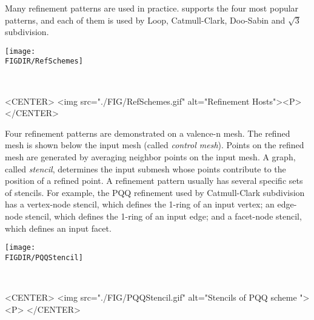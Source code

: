 Many refinement patterns are used in practice. 
 supports the four most popular 
patterns, and each of them is used by Loop, 
Catmull-Clark\cite{cgal:cc-rgbss-78}, Doo-Sabin 
and $\sqrt{3}$ subdivision.  

\begin{ccTexOnly}
  \begin{center}
    \parbox{0.6\textwidth}{%
      \texttt{[image: \\FIGDIR/RefSchemes]}%
    }\\ \vspace{0.5cm}
  \end{center}
\end{ccTexOnly}

\begin{ccHtmlOnly}
  <CENTER>
     <img src="./FIG/RefSchemes.gif" alt="Refinement Hosts"><P>
  </CENTER>
\end{ccHtmlOnly}

Four refinement patterns are demonstrated on a valence-n mesh.
The refined mesh is shown below the input 
mesh (called \emph{control mesh}).
Points on the refined mesh are generated by averaging
neighbor points on the input mesh. A graph, called \emph{stencil}, 
determines the input submesh whose points contribute to the 
position of a refined point. A refinement pattern usually has 
several specific sets of stencils.
For example, the PQQ
refinement used by Catmull-Clark subdivision has a vertex-node stencil, 
which defines the 1-ring of an input vertex; an edge-node stencil, 
which defines the 1-ring of an input edge; and a facet-node stencil, 
which defines an input facet.

\begin{ccTexOnly}
  \begin{center}
    \parbox{0.5\textwidth}{%
      \texttt{[image: \\FIGDIR/PQQStencil]}%
    }\\ \vspace{0.5cm}
  \end{center}
\end{ccTexOnly}

\begin{ccHtmlOnly}
  <CENTER>
     <img src="./FIG/PQQStencil.gif" alt="Stencils of PQQ scheme "><P>
  </CENTER>
\end{ccHtmlOnly}


